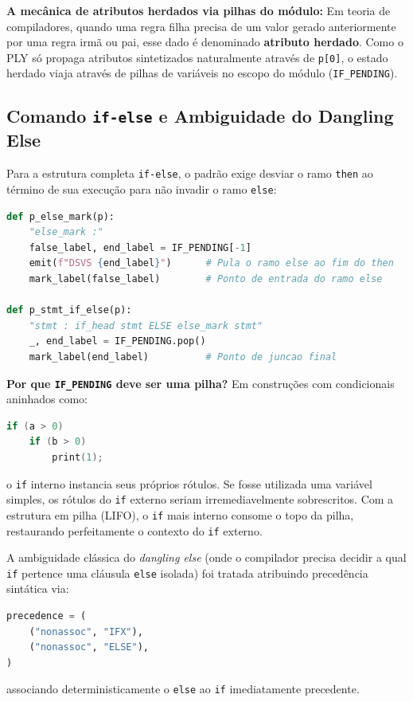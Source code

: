 \documentclass[12pt,a4paper]{article}
\begin{document}
\noindent\textbf{A mecânica de atributos herdados via pilhas do módulo:}
Em teoria de compiladores, quando uma regra filha precisa de um valor gerado
anteriormente por uma regra irmã ou pai, esse dado é denominado \textbf{atributo herdado}.
Como o PLY só propaga atributos sintetizados naturalmente através de \texttt{p[0]},
o estado herdado viaja através de pilhas de variáveis no escopo do módulo
(\texttt{IF\_PENDING}).

\subsection{Comando \texttt{if-else} e Ambiguidade do Dangling Else}

Para a estrutura completa \texttt{if-else}, o padrão exige desviar o ramo \texttt{then}
ao término de sua execução para não invadir o ramo \texttt{else}:

\begin{lstlisting}[language=Python]
def p_else_mark(p):
    "else_mark :"
    false_label, end_label = IF_PENDING[-1]
    emit(f"DSVS {end_label}")      # Pula o ramo else ao fim do then
    mark_label(false_label)        # Ponto de entrada do ramo else

def p_stmt_if_else(p):
    "stmt : if_head stmt ELSE else_mark stmt"
    _, end_label = IF_PENDING.pop()
    mark_label(end_label)          # Ponto de juncao final
\end{lstlisting}

\noindent\textbf{Por que \texttt{IF\_PENDING} deve ser uma pilha?} Em construções com
condicionais aninhados como:
\begin{lstlisting}[language=C]
if (a > 0)
    if (b > 0)
        print(1);
\end{lstlisting}
o \texttt{if} interno instancia seus próprios rótulos. Se fosse utilizada uma variável
simples, os rótulos do \texttt{if} externo seriam irremediavelmente sobrescritos.
Com a estrutura em pilha (LIFO), o \texttt{if} mais interno consome o topo da pilha,
restaurando perfeitamente o contexto do \texttt{if} externo.

A ambiguidade clássica do \textit{dangling else} (onde o compilador precisa decidir
a qual \texttt{if} pertence uma cláusula \texttt{else} isolada) foi tratada atribuindo
precedência sintática via:
\begin{lstlisting}[language=Python]
precedence = (
    ("nonassoc", "IFX"),
    ("nonassoc", "ELSE"),
)
\end{lstlisting}
associando deterministicamente o \texttt{else} ao \texttt{if} imediatamente precedente.
\end{document}
